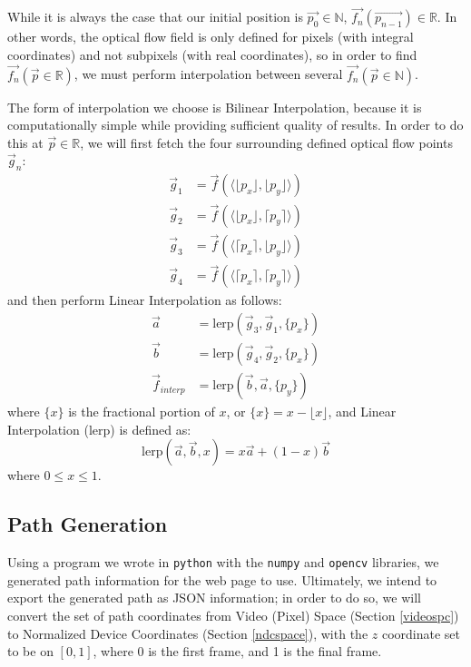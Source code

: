 While it is always the case that our initial position is $\vec{p_0} \in \mathbb{N}$, $\vec{f_n}(\vec{p_{n-1}}) \in \mathbb{R}$. In other words, the optical flow field is only defined for pixels (with integral coordinates) and not subpixels (with real coordinates), so in order to find $\vec{f_n}(\vec{p} \in \mathbb{R})$, we must perform interpolation between several $\vec{f_n}(\vec{p} \in \mathbb{N})$.
\par The form of interpolation we choose is Bilinear Interpolation, because it is computationally simple while providing sufficient quality of results. In order to do this at $\vec{p} \in \mathbb{R}$, we will first fetch the four surrounding defined optical flow points $\vec{g}_n$:
\begin{align*}
    \vec{g}_1 & = \vec{f}(\langle \lfloor p_x \rfloor, \lfloor p_y \rfloor \rangle) \\
    \vec{g}_2 & = \vec{f}(\langle \lfloor p_x \rfloor, \lceil p_y \rceil \rangle) \\
    \vec{g}_3 & = \vec{f}(\langle \lceil p_x \rceil, \lfloor p_y \rfloor \rangle) \\
    \vec{g}_4 & = \vec{f}(\langle \lceil p_x \rceil, \lceil p_y \rceil \rangle)
\end{align*}
and then perform Linear Interpolation as follows:
\begin{align*}
    \vec{a} & = \text{lerp} (\vec{g}_3, \vec{g}_1, \{p_x\}) \\
    \vec{b} & = \text{lerp} (\vec{g}_4, \vec{g}_2, \{p_x\}) \\
    \vec{f}_{interp} & = \text{lerp} (\vec{b}, \vec{a}, \{p_y\})
\end{align*}
where $\{x\}$ is the fractional portion of $x$, or $\{x\} = x - \lfloor x \rfloor$, and Linear Interpolation (lerp) is defined as:
\begin{equation}
    \text{lerp}(\vec{a}, \vec{b}, x) = x\vec{a} + (1-x)\vec{b}
\end{equation}
where $0 \leq x \leq 1$.

\subsection{Path Generation}
Using a program we wrote in \texttt{python} with the \texttt{numpy} and \texttt{opencv} libraries, we generated path information for the web page to use. Ultimately, we intend to export the generated path as JSON information; in order to do so, we will convert the set of path coordinates from Video (Pixel) Space (Section \ref{videospc}) to Normalized Device Coordinates (Section \ref{ndcspace}), with the $z$ coordinate set to be on $[0,1]$, where 0 is the first frame, and 1 is the final frame.

